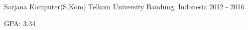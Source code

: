 \begin{cventries}

\cventry
    {Sarjana Komputer(S.Kom)}
    {Telkom University}
    {Bandung, Indonesia}
    {2012 - 2016}
    {
        \begin{cvitems}
            \item {GPA: 3.34}
        \end{cvitems}
    }
    
\end{cventries}

